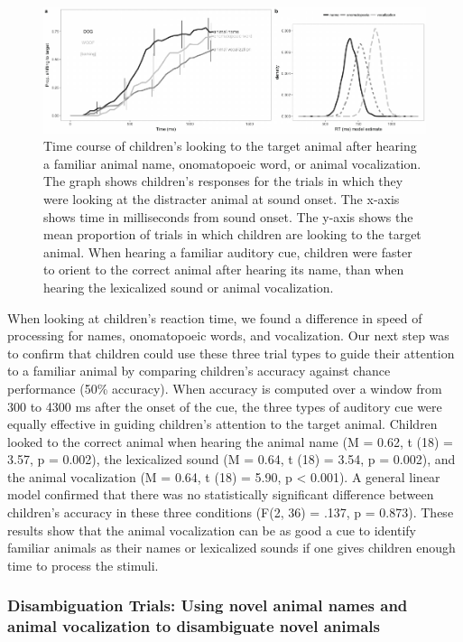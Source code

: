 \documentclass[english,floatsintext,man]{apa6}
\theoremstyle{definition}
\theoremstyle{definition}
\theoremstyle{definition}
\theoremstyle{remark}
\begin{document}
\begin{figure}
\includegraphics[width=1\linewidth]{anime_manuscript_files/figure-latex/unnamed-chunk-4-1} \caption{Time course of children’s looking to the target animal after hearing a familiar animal name, onomatopoeic word, or animal vocalization. The graph shows children's responses for the trials in which they were looking at the distracter animal at sound onset. The x-axis shows time in milliseconds from sound onset. The y-axis shows the mean proportion of trials in which children are looking to the target animal. When hearing a familiar auditory cue, children were faster to orient to the correct animal after hearing its name, than when hearing the lexicalized sound or animal vocalization.}\label{fig:unnamed-chunk-4}
\end{figure}

When looking at children's reaction time, we found a difference in speed
of processing for names, onomatopoeic words, and vocalization. Our next
step was to confirm that children could use these three trial types to
guide their attention to a familiar animal by comparing children's
accuracy against chance performance (50\% accuracy). When accuracy is
computed over a window from 300 to 4300 ms after the onset of the cue,
the three types of auditory cue were equally effective in guiding
children's attention to the target animal. Children looked to the
correct animal when hearing the animal name (M = 0.62, t (18) = 3.57, p
= 0.002), the lexicalized sound (M = 0.64, t (18) = 3.54, p = 0.002),
and the animal vocalization (M = 0.64, t (18) = 5.90, p \textless{}
0.001). A general linear model confirmed that there was no statistically
significant difference between children's accuracy in these three
conditions (F(2, 36) = .137, p = 0.873). These results show that the
animal vocalization can be as good a cue to identify familiar animals as
their names or lexicalized sounds if one gives children enough time to
process the stimuli.

\subsubsection{Disambiguation Trials: Using novel animal names and
animal vocalization to disambiguate novel
animals}\label{disambiguation-trials-using-novel-animal-names-and-animal-vocalization-to-disambiguate-novel-animals}
\end{document}
